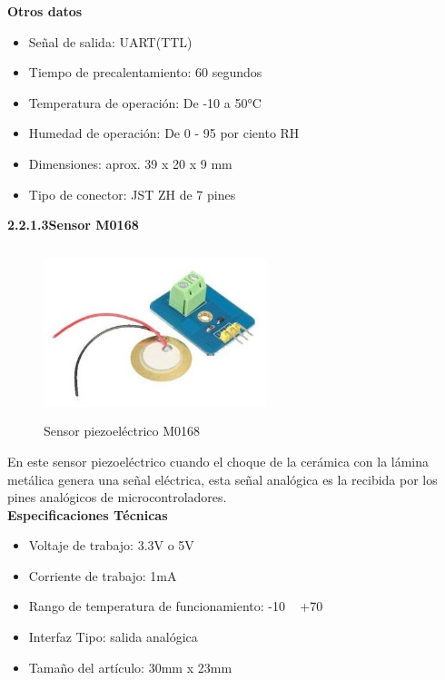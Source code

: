 \textbf{Otros datos}
\begin{itemize}
    \item Señal de salida: UART(TTL)
    \item Tiempo de precalentamiento: 60 segundos
    \item Temperatura de operación: De -10 a 50°C
    \item Humedad de operación: De 0 - 95 por ciento RH
    \item Dimensiones: aprox. 39 x 20 x 9 mm
    \item Tipo de conector: JST ZH de 7 pines
\end{itemize}

\vspace{0.5cm}

        \textbf{2.2.1.3\hspace{5mm}Sensor M0168}

\begin{figure}[H]
      \centering
      \includegraphics[width=6.5cm, height=5cm]{imagenes/sensor-piezoelectrico.jpg}
      \caption{Sensor piezoeléctrico M0168}
      \label{imag:M0168}
   \end{figure}

En este sensor piezoeléctrico cuando el choque de la cerámica con la lámina metálica genera una señal eléctrica, esta señal analógica es la recibida por los pines analógicos de microcontroladores.\\

\textbf{Especificaciones Técnicas}

\begin{itemize}
    \item Voltaje de trabajo: 3.3V o 5V
    \item Corriente de trabajo: 1mA
    \item Rango de temperatura de funcionamiento: -10 ~ +70
    \item Interfaz Tipo: salida analógica
    \item Tamaño del artículo: 30mm x 23mm
\end{itemize}


